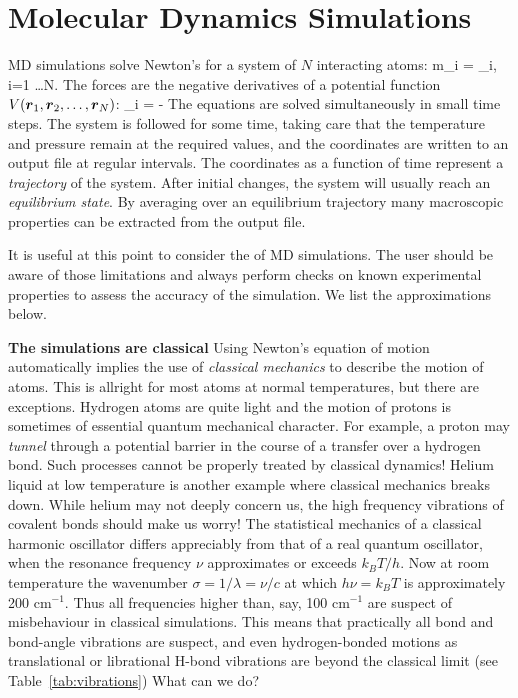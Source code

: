 \section{Molecular Dynamics Simulations}
\label{sec:MDsimulations}
MD simulations solve Newton's  
for a system of $N$ interacting atoms:
\beq
  m_i   = _i, \;i=1 \ldots N.
\eeq
The forces are the negative derivatives of a potential function $V(\mbox{\boldmath ${r}$}_1, 
\mbox{\boldmath ${r}$}_2, \ldots, \mbox{\boldmath ${r}$}_N)$:
\beq
  _i = - 
\eeq
The equations are solved simultaneously in small time steps. The
system is followed for some time, taking care that the temperature and
pressure remain at the required values, and the coordinates are
written to an output file at regular intervals. The coordinates as a
function of time represent a {\em trajectory} of the system. After
initial changes, the system will usually reach an {\em equilibrium
state}. By averaging over an equilibrium trajectory many macroscopic
properties can be extracted from the output file.

It is useful at this point to consider the  of MD
simulations. The user should be aware of those limitations and always
perform checks on known experimental properties to assess the accuracy
of the simulation. We list the approximations below.

{\bf The simulations are classical} Using Newton's equation of motion
automatically implies the use of {\em classical mechanics} to describe
the motion of atoms. This is allright for most atoms at normal
temperatures, but there are exceptions. Hydrogen atoms are quite light
and the motion of protons is sometimes of essential quantum mechanical
character. For example, a proton may {\em tunnel} through a potential
barrier in the course of a transfer over a hydrogen bond. Such
processes cannot be properly treated by classical dynamics! Helium
liquid at low temperature is another example where classical mechanics
breaks down. While helium may not deeply concern us, the high
frequency vibrations of covalent bonds should make us worry! The
statistical mechanics of a classical harmonic oscillator differs
appreciably from that of a real quantum oscillator, when the resonance
frequency $\nu$ approximates or exceeds $k_BT/h$. Now at room
temperature the wavenumber $\sigma = 1/\lambda = \nu/c$ at which $h
\nu = k_BT$ is approximately 200 cm$^{-1}$. Thus all frequencies
higher than, say, 100 cm$^{-1}$ are suspect of misbehaviour in
classical simulations. This means that practically all bond and
bond-angle vibrations are suspect, and even hydrogen-bonded motions as
translational or librational H-bond vibrations are beyond the
classical limit (see Table~\ref{tab:vibrations}) What can we do?

